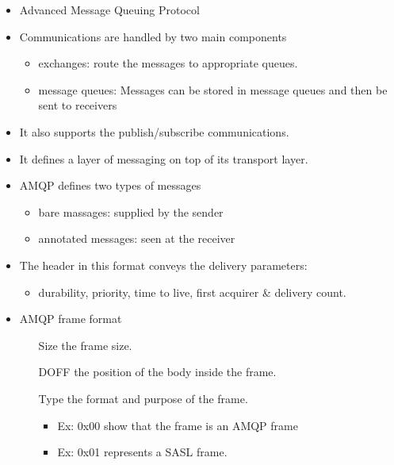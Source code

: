 \begin{itemize}
	\item Advanced Message Queuing Protocol
	\item Communications are handled by two main components
		\begin{itemize}
			\item exchanges: route the messages to appropriate queues.
			\item message queues: Messages can be stored in message queues and then be sent to receivers
		\end{itemize}
	\item It also supports the publish/subscribe communications.
	\item It defines a layer of messaging on top of its transport layer.
	\item AMQP defines two types of messages
		\begin{itemize}
			\item bare massages: supplied by the sender
			\item annotated messages: seen at the receiver
		\end{itemize}
	\item The header in this format conveys the delivery parameters:
		\begin{itemize}
			\item durability, priority, time to live, first acquirer \& delivery count.
		\end{itemize}
	\item AMQP frame format
		\begin{itemize}
			\item[Size] the frame size.
			\item[DOFF] the position of the body inside the frame.
			\item[Type] the format and purpose of the frame.
				\begin{itemize}
					\item Ex: 0x00 show that the frame is an AMQP frame
					\item Ex: 0x01 represents a SASL frame.
				\end{itemize}
			\end{itemize}
		\end{itemize}

